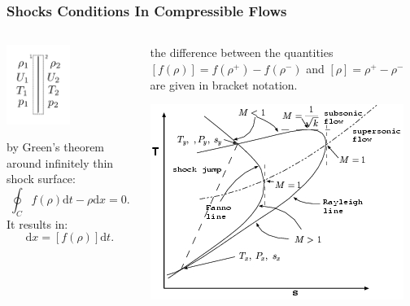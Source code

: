 \documentclass{fancyslides}
\begin{document}
\begin{frame}
 \frametitle{Shocks Conditions In Compressible Flows}
\begin{columns}
\begin{column}{0.5\textwidth}
   \begin{center}
     \includegraphics[width=0.5\textwidth]{shock.png}
     \end{center}
  by Green's theorem around infinitely thin shock surface: 
\begin{equation}
\label{eq:1}
	\oint_{C}f(\rho) \mathrm{d} t-\rho \mathrm{d} x =0.
\end{equation}
It results in:
\begin{equation}
	[\rho]\mathrm{d} x=[f(\rho)]\mathrm{d} t.
\end{equation}
\end{column}
\begin{column}{0.5\textwidth}  %
the difference between the quantities $[f(\rho)]=f(\rho ^+)-f(\rho ^-)$ and $[\rho]=\rho ^+-\rho ^-$ are given in bracket notation.
    \begin{center}
     \includegraphics[width=1.\textwidth]{shockTS.jpg}
     \end{center}
\end{column}
\end{columns}

\end{frame}
\end{document}
